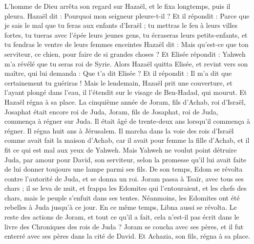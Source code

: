 \begin{multicols}{2}
L’homme de Dieu arrêta son regard sur Hazaël, et le fixa longtemps, puis il pleura.
Hazaël dit : Pourquoi mon seigneur pleure-t-il ? Et il répondit : Parce que je sais le mal que tu feras aux enfants d’Israël ; tu mettras le feu à leurs villes fortes, tu tueras avec l’épée leurs jeunes gens, tu écraseras leurs petits-enfants, et tu fendras le ventre de leurs femmes enceintes
Hazaël dit : Mais qu’est-ce que ton serviteur, ce chien, pour faire de si grandes choses ? Et Elisée répondit : Yahweh m’a révélé que tu seras roi de Syrie.
Alors Hazaël quitta Elisée, et revint vers son maître, qui lui demanda : Que t’a dit Elisée ? Et il répondit : Il m’a dit que certainement tu guériras !
Mais le lendemain, Hazaël prit une couverture, et l’ayant plongé dans l’eau, il l’étendit sur le visage de Ben-Hadad, qui mourut. Et Hazaël régna à sa place.
La cinquième année de Joram, fils d’Achab, roi d’Israël, Josaphat était encore roi de Juda, Joram, fils de Josaphat, roi de Juda, commença à régner sur Juda.
Il était âgé de trente-deux ans lorsqu’il commença à régner. Il régna huit ans à Jérusalem.
Il marcha dans la voie des rois d’Israël comme avait fait la maison d’Achab, car il avait pour femme la fille d’Achab, et il fit ce qui est mal aux yeux de Yahweh.
Mais Yahweh ne voulut point détruire Juda, par amour pour David, son serviteur, selon la promesse qu’il lui avait faite de lui donner toujours une lampe parmi ses fils.
De son temps, Edom se révolta contre l’autorité de Juda, et se donna un roi.
Joram passa à Tsaïr, avec tous ses chars ; il se leva de nuit, et frappa les Edomites qui l’entouraient, et les chefs des chars, mais le peuple s’enfuit dans ses tentes.
Néanmoins, les Edomites ont été rebelles à Juda jusqu’à ce jour. En ce même temps, Libna aussi se révolta.
Le reste des actions de Joram, et tout ce qu’il a fait, cela n’est-il pas écrit dans le livre des Chroniques des rois de Juda ?
Joram se coucha avec ses pères, et il fut enterré avec ses pères dans la cité de David. Et Achazia, son fils, régna à sa place.

\end{multicols}
